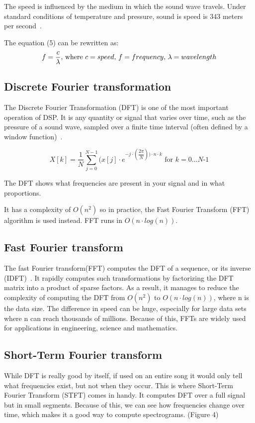 The speed is influenced by the medium in which the sound wave travels. Under standard conditions of temperature and pressure, sound is speed is 343 meters per second~\cite{speed_of_sound}.

The equation (5) can be rewritten as:
\begin{equation}
f = \dfrac{c}{\lambda} \textnormal{, where $c=speed$, $f=frequency$, $\lambda=wavelength$}
\end{equation}


\subsection{Discrete Fourier transformation}
The Discrete Fourier Transformation (DFT) is one of the most important operation of DSP. It is any quantity or signal that varies over time, such as the pressure of a sound wave, sampled over a finite time interval (often defined by a window function)~\cite{discrete}.
\par

\begin{equation}
X[k] = \dfrac{1}{N} \sum_{j=0}^{N-1}(x[j] \cdot e^ {-j \cdot( \dfrac{2\pi}{N}) ) \cdot n \cdot k }  \text{ for $k = 0...N$-1}
\end{equation}

The DFT shows what frequencies are present in your signal and in what proportions.
\par
It has a complexity of $O(n^2)$ so in practice, the Fast Fourier Transform (FFT) algorithm is used instead. FFT runs in $O(n\cdot log(n))$.

\subsection{Fast Fourier transform}
The fast Fourier transform(FFT) computes the DFT of a sequence, or its inverse (IDFT)~\cite{FFT}. It rapidly computes such transformations by factorizing the DFT matrix into a product of sparse factors. As a result, it manages to reduce the complexity of computing the DFT from $O(n^2)$ to $O(n\cdot log(n))$, where n is the data size. The difference in speed can be huge, especially for large data sets where n can reach thousands of millions. Because of this, FFTs are widely used for applications in engineering, science and mathematics.

\subsection{Short-Term Fourier transform}
While DFT is really good by itself, if used on an entire song it would only tell what frequencies exist, but not when they occur. This is where Short-Term Fourier Transform (STFT) comes in handy. It computes DFT over a full signal but in small segments. Because of this, we can see how frequencies change over time, which makes it a good way to compute spectrograms. (Figure 4) 

